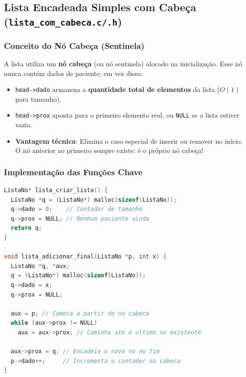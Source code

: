 \documentclass[11pt,a4paper]{article}
\begin{document}
\subsection{Lista Encadeada Simples com Cabeça (\texttt{lista\_com\_cabeca.c/.h})}

\subsubsection{Conceito do Nó Cabeça (Sentinela)}
A lista utiliza um \textbf{nó cabeça} (ou nó sentinela) alocado na inicialização. Esse nó nunca contém dados de paciente; em vez disso:
\begin{itemize}
    \item \texttt{head->dado} armazena a \textbf{quantidade total de elementos} da lista ($O(1)$ para tamanho).
    \item \texttt{head->prox} aponta para o primeiro elemento real, ou \texttt{NULL} se a lista estiver vazia.
    \item \textbf{Vantagem técnica}: Elimina o caso especial de inserir ou remover no início. O nó anterior ao primeiro sempre existe: é o próprio nó cabeça!
\end{itemize}

\begin{center}
\end{center}

\subsubsection{Implementação das Funções Chave}

\begin{lstlisting}[language=C, caption={{Criação e Inserção no Fim com Nó Cabeça}}]
ListaNo* lista_criar_lista() {
  ListaNo *q = (ListaNo*) malloc(sizeof(ListaNo));
  q->dado = 0;    // Contador de tamanho
  q->prox = NULL; // Nenhum paciente ainda
  return q; 
} 

void lista_adicionar_final(ListaNo *p, int x) {
  ListaNo *q, *aux;
  q = (ListaNo*) malloc(sizeof(ListaNo));
  q->dado = x;
  q->prox = NULL;
  
  aux = p; // Comeca a partir do no cabeca
  while (aux->prox != NULL) 
    aux = aux->prox; // Caminha ate o ultimo no existente
    
  aux->prox = q; // Encadeia o novo no no fim
  p->dado++;     // Incrementa o contador na cabeca
}
\end{lstlisting}
\end{document}

